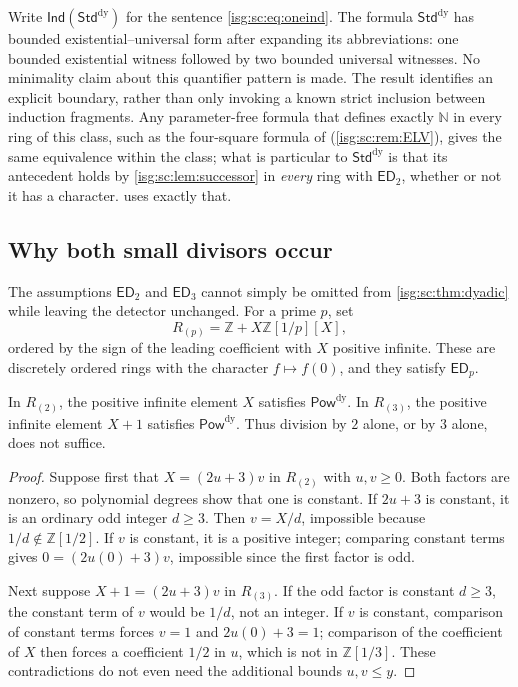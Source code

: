 \documentclass[11pt]{article}
\theoremstyle{definition}
\theoremstyle{remark}
\newcommand{\Z}{\mathbb{Z}}
\newcommand{\N}{\mathbb{N}}
\newcommand{\PowDy}{\mathsf{Pow}^{\mathrm{dy}}}
\newcommand{\StdDy}{\mathsf{Std}^{\mathrm{dy}}}
\newcommand{\Ind}{\mathsf{Ind}}
\newcommand{\ED}{\mathsf{ED}}
\begin{document}
Write $\Ind(\StdDy)$ for the sentence \eqref{isg:sc:eq:oneind}. The
formula $\StdDy$ has bounded existential--universal form after expanding
its abbreviations: one bounded existential witness followed by two
bounded universal witnesses. No minimality claim about this quantifier
pattern is made. The result identifies an explicit boundary, rather than
only invoking a known strict inclusion between induction fragments. Any
parameter-free formula that defines exactly $\N$ in every ring of this
class, such as the four-square formula of \cite[Theorem~2.9]{ELV}
(\cref{isg:sc:rem:ELV}), gives the same equivalence within the class;
what is particular to $\StdDy$ is that its antecedent holds by
\cref{isg:sc:lem:successor} in \emph{every} ring with $\ED_2$, whether or
not it has a character.  uses exactly that.

\subsection{Why both small divisors occur}\label{isg:sc:sec:sharp}
The assumptions $\ED_2$ and $\ED_3$ cannot simply be omitted from
\cref{isg:sc:thm:dyadic} while leaving the detector unchanged. For a prime
$p$, set
\[
 R_{(p)}=\Z+X\Z[1/p][X],
\]
ordered by the sign of the leading coefficient with $X$ positive infinite.
These are discretely ordered rings with the character $f\mapsto f(0)$, and
they satisfy $\ED_p$.

\begin{proposition}\label{isg:sc:prop:sharp}
In $R_{(2)}$, the positive infinite element $X$ satisfies $\PowDy$. In
$R_{(3)}$, the positive infinite element $X+1$ satisfies $\PowDy$. Thus
division by $2$ alone, or by $3$ alone, does not suffice.
\end{proposition}
\begin{proof}
Suppose first that $X=(2u+3)v$ in $R_{(2)}$ with $u,v\ge0$. Both factors
are nonzero, so polynomial degrees show that one is constant. If $2u+3$ is
constant, it is an ordinary odd integer $d\ge3$. Then $v=X/d$, impossible
because $1/d\notin\Z[1/2]$. If $v$ is constant, it is a positive integer;
comparing constant terms gives $0=(2u(0)+3)v$, impossible since the first
factor is odd.

Next suppose $X+1=(2u+3)v$ in $R_{(3)}$. If the odd factor is constant
$d\ge3$, the constant term of $v$ would be $1/d$, not an integer. If $v$
is constant, comparison of constant terms forces $v=1$ and $2u(0)+3=1$;
comparison of the coefficient of $X$ then forces a coefficient $1/2$ in
$u$, which is not in $\Z[1/3]$. These contradictions do not even need the
additional bounds $u,v\le y$.
\end{proof}
\end{document}
